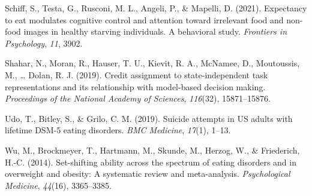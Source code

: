 \documentclass[
  man,floatsintext]{apa6}
\newlength{\cslhangindent}
\newlength{\cslentryspacingunit} %
\newenvironment{CSLReferences}[2] %
 {%
  \setlength{\parindent}{0pt}
  \ifodd #1
  \let\oldpar\par
  \def\par{\hangindent=\cslhangindent\oldpar}
  \fi
  \setlength{\parskip}{#2\cslentryspacingunit}
 }%
 {}
\begin{document}
\begin{CSLReferences}{1}{0}
\leavevmode{}%
Schiff, S., Testa, G., Rusconi, M. L., Angeli, P., \& Mapelli, D. (2021). Expectancy to eat modulates cognitive control and attention toward irrelevant food and non-food images in healthy starving individuals. A behavioral study. \emph{Frontiers in Psychology}, \emph{11}, 3902.

\leavevmode{}%
Shahar, N., Moran, R., Hauser, T. U., Kievit, R. A., McNamee, D., Moutoussis, M., \ldots{} Dolan, R. J. (2019). Credit assignment to state-independent task representations and its relationship with model-based decision making. \emph{Proceedings of the National Academy of Sciences}, \emph{116}(32), 15871--15876.

\leavevmode{}%
Udo, T., Bitley, S., \& Grilo, C. M. (2019). Suicide attempts in US adults with lifetime DSM-5 eating disorders. \emph{BMC Medicine}, \emph{17}(1), 1--13.

\leavevmode{}%
Wu, M., Brockmeyer, T., Hartmann, M., Skunde, M., Herzog, W., \& Friederich, H.-C. (2014). Set-shifting ability across the spectrum of eating disorders and in overweight and obesity: A systematic review and meta-analysis. \emph{Psychological Medicine}, \emph{44}(16), 3365--3385.

\end{CSLReferences}
\end{document}
